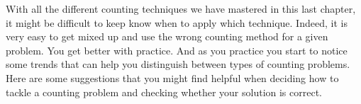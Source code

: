 \documentclass[12pt]{article}
\begin{document}
\begin{activity}
\begin{questions}
\end{questions}
\end{activity}

With all the different counting techniques we have mastered in this last chapter, it might be difficult to keep know when to apply which technique.  Indeed, it is very easy to get mixed up and use the wrong counting method for a given problem.  You get better with practice.  And as you practice you start to notice some trends that can help you distinguish between types of counting problems.  Here are some suggestions that you might find helpful when deciding how to tackle a counting problem and checking whether your solution is correct.
\end{document}
